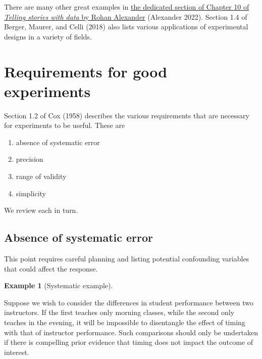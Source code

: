 \documentclass[
  11pt,
  letterpaper,
]{scrbook}
\providecommand{\tightlist}{%
  \setlength{\itemsep}{0pt}\setlength{\parskip}{0pt}}\usepackage{longtable,booktabs,array}
\theoremstyle{definition}
\newtheorem{example}{Example}[chapter]
\theoremstyle{remark}
\begin{document}
There are many other great examples in
\href{https://tellingstorieswithdata.com/08-hunt.html\#rct-examples}{the
dedicated section of Chapter 10 of \emph{Telling stories with data} by
Rohan Alexander} (Alexander 2022). Section 1.4 of Berger, Maurer, and
Celli (2018) also lists various applications of experimental designs in
a variety of fields.

\hypertarget{requirements-for-good-experiments}{%
\section{Requirements for good
experiments}\label{requirements-for-good-experiments}}

Section 1.2 of Cox (1958) describes the various requirements that are
necessary for experiments to be useful. These are

\begin{enumerate}
\def\labelenumi{\arabic{enumi}.}
\tightlist
\item
  absence of systematic error
\item
  precision
\item
  range of validity
\item
  simplicity
\end{enumerate}

We review each in turn.

\hypertarget{absence-of-systematic-error}{%
\subsection{Absence of systematic
error}\label{absence-of-systematic-error}}

This point requires careful planning and listing potential confounding
variables that could affect the response.

\begin{example}[Systematic
example]\protect\hypertarget{exm-systematicerror}{}\label{exm-systematicerror}

Suppose we wish to consider the differences in student performance
between two instructors. If the first teaches only morning classes,
while the second only teaches in the evening, it will be impossible to
disentangle the effect of timing with that of instructor performance.
Such comparisons should only be undertaken if there is compelling prior
evidence that timing does not impact the outcome of interest.

\end{example}
\end{document}
